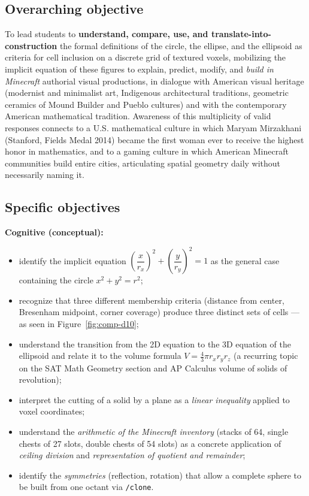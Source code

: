 \documentclass[12pt,a4paper]{scrartcl}
\newcommand{\acc}[1]{\textcolor{accent}{\textbf{#1}}}
\newcommand{\cmd}[1]{\textcolor{earth}{\texttt{\small #1}}}
\begin{document}
\subsection{Overarching objective}

To lead students to \acc{understand, compare, use, and translate-into-construction} the formal definitions of the circle, the ellipse, and the ellipsoid as criteria for cell inclusion on a discrete grid of textured voxels, mobilizing the implicit equation of these figures to explain, predict, modify, and \emph{build in Minecraft} authorial visual productions, in dialogue with American visual heritage (modernist and minimalist art, Indigenous architectural traditions, geometric ceramics of Mound Builder and Pueblo cultures) and with the contemporary American mathematical tradition. Awareness of this multiplicity of valid responses connects to a U.S. mathematical culture in which Maryam Mirzakhani (Stanford, Fields Medal 2014) became the first woman ever to receive the highest honor in mathematics, and to a gaming culture in which American Minecraft communities build entire cities, articulating spatial geometry daily without necessarily naming it.

\subsection{Specific objectives}

\textbf{Cognitive (conceptual):}
\begin{itemize}[leftmargin=1.3em,itemsep=0.2em,topsep=0.3em]
  \item identify the implicit equation $\left(\dfrac{x}{r_x}\right)^{\!2} + \left(\dfrac{y}{r_y}\right)^{\!2} = 1$ as the general case containing the circle $x^2 + y^2 = r^2$;
  \item recognize that three different membership criteria (distance from center, Bresenham midpoint, corner coverage) produce three distinct sets of cells --- as seen in Figure~\ref{fig:comp-d10};
  \item understand the transition from the 2D equation to the 3D equation of the ellipsoid and relate it to the volume formula $V = \tfrac{4}{3}\pi r_x r_y r_z$ (a recurring topic on the SAT Math Geometry section and AP Calculus volume of solids of revolution);
  \item interpret the cutting of a solid by a plane as a \emph{linear inequality} applied to voxel coordinates;
  \item understand the \emph{arithmetic of the Minecraft inventory} (stacks of 64, single chests of 27 slots, double chests of 54 slots) as a concrete application of \emph{ceiling division} and \emph{representation of quotient and remainder};
  \item identify the \emph{symmetries} (reflection, rotation) that allow a complete sphere to be built from one octant via \cmd{/clone}.
\end{itemize}
\end{document}
